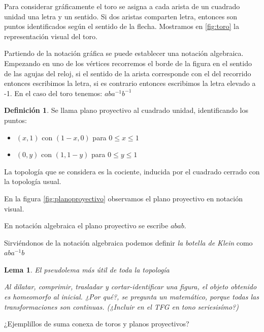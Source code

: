 \documentclass[a4paper,11pt,spanish, twoside, leqno]{tfg-uam}
\newtheorem{lema}[teor]{Lema}
\theoremstyle{definition}
\newtheorem{defin}[teor]{Definici\'on}
\begin{document}
Para considerar gráficamente el toro se asigna a cada arista de un cuadrado unidad una letra y un sentido. Si dos aristas comparten letra, entonces son puntos identificados según el sentido de la flecha. Mostramos en \ref{fig:toro} la representación visual del toro.


Partiendo de la notación gráfica se puede establecer una notación algebraica. Empezando en uno de los vértices recorremos el borde de la figura en el sentido de las agujas del reloj, si el sentido  de la arista corresponde con el del recorrido entonces escribimos la letra, si es contrario entonces escribimos la letra elevado a -1. En el caso del toro tenemos: $aba^{-1}b^{-1}$ 



\begin{defin}\label{defin:planoproyectivo}
	Se llama plano proyectivo al cuadrado unidad, identificando los puntos:
	\begin{itemize}
		\item 
		$(x,1)$ con $(1-x,0)$ para $0\leq x\leq 1$
		\item 
		$(0,y)$ con $(1,1-y)$ para $0\leq y\leq 1$
	\end{itemize}
	La topología que se considera es la cociente, inducida por el cuadrado cerrado con la topología usual.
\end{defin}

En la figura \ref{fig:planoproyectivo} observamos el plano proyectivo en notación visual.

En notación algebraica el plano proyectivo se escribe $abab$.

Sirviéndonos de la notación algebraica podemos definir \textit{la botella de Klein} como $aba^{-1}b$ 




\begin{lema}{El pseudolema más útil de toda la topología}
	
	Al dilatar, comprimir, trasladar y cortar-identificar una figura, el objeto obtenido es homeomorfo al inicial. ¿Por qué?, se pregunta un matemático, porque todas las transformaciones son continuas. (¿Incluir en el TFG en tono seriesisímo?) 
\end{lema}

¿Ejemplillos de suma conexa de toros y planos proyectivos?
\end{document}
